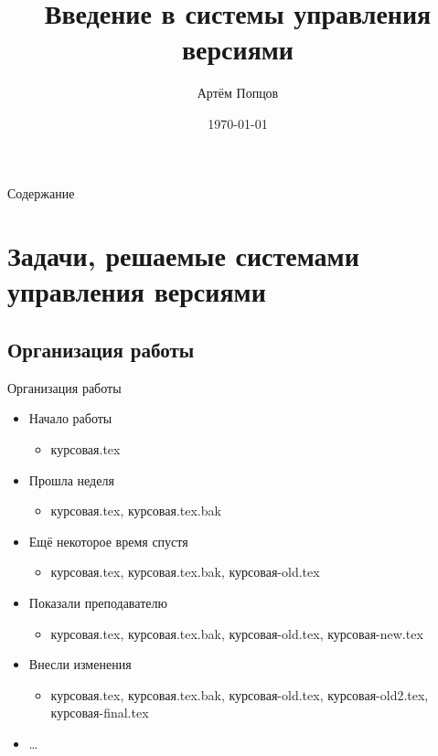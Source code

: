 \documentclass[presentation]{beamer}
\author{Артём Попцов}
\date{\today}
\title{Введение в системы управления версиями}
\begin{document}
\maketitle



\begin{frame}{Содержание}
  \setcounter{tocdepth}{1}
  \tableofcontents
\end{frame}



\section{Задачи, решаемые системами управления версиями}

\subsection{Организация работы}

\begin{frame}{Организация работы}
  \begin{itemize}
  \item Начало работы
    \begin{itemize}
    \item курсовая.tex
    \end{itemize}
  \item Прошла неделя
    \begin{itemize}
    \item курсовая.tex, курсовая.tex.bak
    \end{itemize}
  \item Ещё некоторое время спустя
    \begin{itemize}
    \item курсовая.tex, курсовая.tex.bak, курсовая-old.tex
    \end{itemize}
  \item Показали преподавателю
    \begin{itemize}
    \item курсовая.tex, курсовая.tex.bak, курсовая-old.tex,
      курсовая-new.tex
    \end{itemize}
  \item Внесли изменения
    \begin{itemize}
    \item курсовая.tex, курсовая.tex.bak, курсовая-old.tex,
      курсовая-old2.tex, курсовая-final.tex
    \end{itemize}
  \item \ldots{}
  \end{itemize}
\end{frame}
\end{document}
